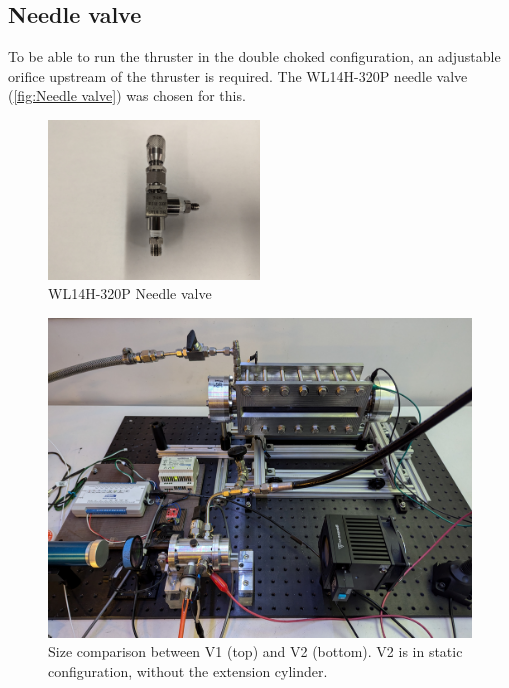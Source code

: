         \subsection{Needle valve}
            
            To be able to run the thruster in the double choked configuration, an adjustable orifice upstream of the thruster is required. The WL14H-320P needle valve (\autoref{fig:Needle valve}) was chosen for this.

            \begin{figure}[!ht]
                \centering
                \includegraphics[width=0.50\textwidth]{assets/3 design/Needle valve.jpg}
                \caption{WL14H-320P Needle valve}
                \label{fig:Needle valve}
            \end{figure}

        \begin{figure}[!ht]
            \centering
            \includegraphics[width=\textwidth]{assets/3 design/V1 V2 comparison.png}
            \caption{Size comparison between V1 (top) and V2 (bottom). V2 is in static configuration, without the extension cylinder.}
        \end{figure} 